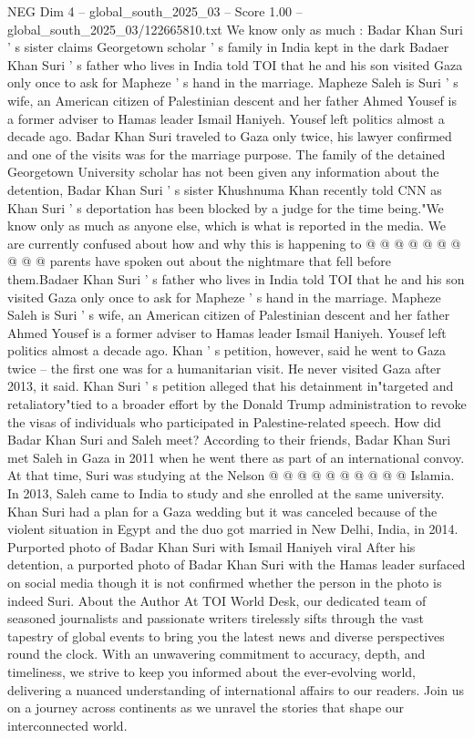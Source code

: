 \begin{textsample}{NEG Dim 4 – global\_south\_2025\_03 – Score 1.00 – global\_south\_2025\_03/122665810.txt}  \label{ex:f4_neg_429}
We know only as much : Badar Khan Suri ' s sister claims Georgetown scholar ' s family in India kept in the dark Badaer Khan Suri ' s father who lives in India told TOI that he and his son visited Gaza only once to ask for Mapheze ' s hand in the marriage.
Mapheze Saleh is Suri ' s wife, an American citizen of Palestinian descent and her father Ahmed Yousef is a former adviser to Hamas leader Ismail Haniyeh.
Yousef left politics almost a decade ago.
Badar Khan Suri traveled to Gaza only twice, his lawyer confirmed and one of the visits was for the marriage purpose.
The family of the detained Georgetown University scholar has not been given any information about the detention, Badar Khan Suri ' s sister Khushnuma Khan recently told CNN as Khan Suri ' s deportation has been blocked by a judge for the time being."We know only as much as anyone else, which is what is reported in the media.
We are currently confused about how and why this is happening to @ @ @ @ @ @ @ @ @ @ parents have spoken out about the nightmare that fell before them.Badaer Khan Suri ' s father who lives in India told TOI that he and his son visited Gaza only once to ask for Mapheze ' s hand in the marriage.
Mapheze Saleh is Suri ' s wife, an American citizen of Palestinian descent and her father Ahmed Yousef is a former adviser to Hamas leader Ismail Haniyeh.
Yousef left politics almost a decade ago.
Khan ' s petition, however, said he went to Gaza twice -- the first one was for a humanitarian visit.
He never visited Gaza after 2013, it said.
Khan Suri ' s petition alleged that his detainment in"targeted and retaliatory"tied to a broader effort by the Donald Trump administration to revoke the visas of individuals who participated in Palestine-related speech.
How did Badar Khan Suri and Saleh meet?
According to their friends, Badar Khan Suri met Saleh in Gaza in 2011 when he went there as part of an international convoy.
At that time, Suri was studying at the Nelson @ @ @ @ @ @ @ @ @ @ Islamia.
In 2013, Saleh came to India to study and she enrolled at the same university.
Khan Suri had a plan for a Gaza wedding but it was canceled because of the violent situation in Egypt and the duo got married in New Delhi, India, in 2014.
Purported photo of Badar Khan Suri with Ismail Haniyeh viral After his detention, a purported photo of Badar Khan Suri with the Hamas leader surfaced on social media though it is not confirmed whether the person in the photo is indeed Suri.
About the Author At TOI World Desk, our dedicated team of seasoned journalists and passionate writers tirelessly sifts through the vast tapestry of global events to bring you the latest news and diverse perspectives round the clock.
With an unwavering commitment to accuracy, depth, and timeliness, we strive to keep you informed about the ever-evolving world, delivering a nuanced understanding of international affairs to our readers.
Join us on a journey across continents as we unravel the stories that shape our interconnected world.

\end{textsample}
